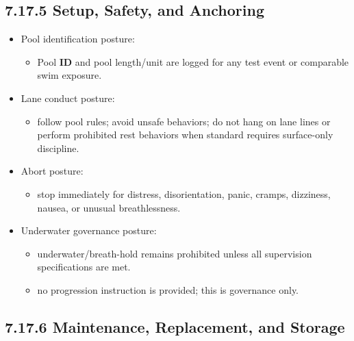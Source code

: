 \documentclass[10pt]{article}
\begin{document}
\subsection*{7.17.5 Setup, Safety, and Anchoring}
{}

\begin{itemize}
\item Pool identification posture:
  \begin{itemize}
  \item Pool \textbf{ID} and pool length/unit are logged for any test event or comparable swim exposure.
  \end{itemize}
\item Lane conduct posture:
  \begin{itemize}
  \item follow pool rules; avoid unsafe behaviors; do not hang on lane lines or perform prohibited rest behaviors when standard requires surface-only discipline.
  \end{itemize}
\item Abort posture:
  \begin{itemize}
  \item stop immediately for distress, disorientation, panic, cramps, dizziness, nausea, or unusual breathlessness.
  \end{itemize}
\item Underwater governance posture:
  \begin{itemize}
  \item underwater/breath-hold remains prohibited unless all supervision specifications are met.
  \item no progression instruction is provided; this is governance only.
  \end{itemize}
\end{itemize}

\subsection*{7.17.6 Maintenance, Replacement, and Storage}
{}
\end{document}
